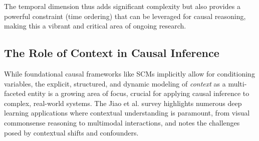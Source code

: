 {The temporal dimension thus adds significant complexity but also provides a powerful constraint (time ordering) that can be leveraged for causal reasoning, making this a vibrant and critical area of ongoing research.


\subsection{The Role of Context in Causal Inference}
\label{subsec:context_temporality_causality}

While foundational causal frameworks like SCMs implicitly allow for conditioning variables, the explicit, structured, and dynamic modeling of \textit{context} as a multi-faceted entity is a growing area of focus, crucial for applying causal inference to complex, real-world systems. The Jiao et al. survey \cite{jiao2024causal} highlights numerous deep learning applications where contextual understanding is paramount, from visual commonsense reasoning to multimodal interactions, and notes the challenges posed by contextual shifts and confounders.

}
